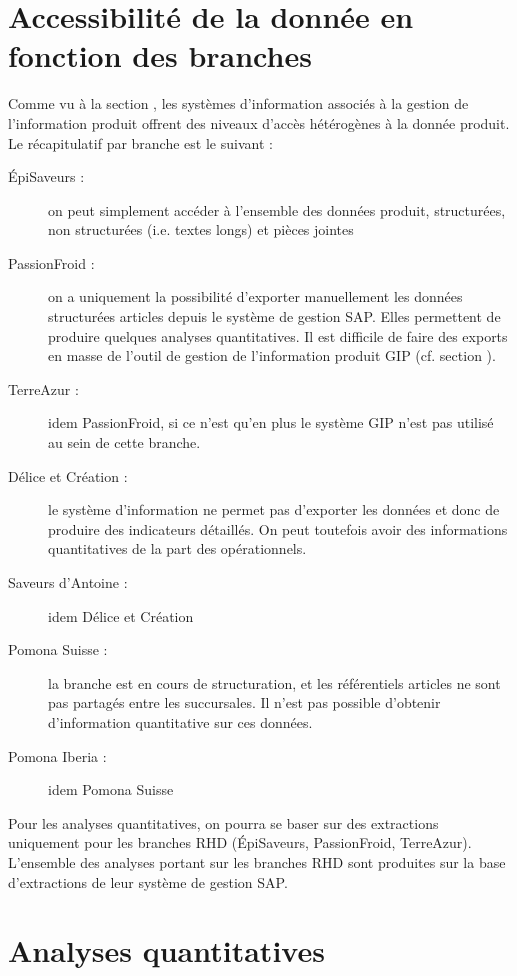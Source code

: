         \section{Accessibilité de la donnée en fonction des branches}

        Comme vu à la section , les systèmes d'information associés à la gestion de l'information produit offrent des niveaux d'accès hétérogènes à la donnée produit.
        Le récapitulatif par branche est le suivant : 
        \begin{description}
            \item[\'{E}piSaveurs :] on peut simplement accéder à l'ensemble des données produit, structurées, non structurées (i.e. textes longs) et pièces jointes
            \item[PassionFroid :] on a uniquement la possibilité d'exporter manuellement les données structurées articles depuis le système de gestion SAP.
            Elles permettent de produire quelques analyses quantitatives.
            Il est difficile de faire des exports en masse de l'outil de gestion de l'information produit GIP (cf. section ).
            \item[TerreAzur :] idem PassionFroid, si ce n'est qu'en plus le système GIP n'est pas utilisé au sein de cette branche.
            \item[Délice et Création :] le système d'information ne permet pas d'exporter les données et donc de produire des indicateurs détaillés. On peut toutefois avoir des informations quantitatives de la part des opérationnels.
            \item[Saveurs d'Antoine :] idem Délice et Création
            \item[Pomona Suisse :] la branche est en cours de structuration, et les référentiels articles ne sont pas partagés entre les succursales. Il n'est pas possible d'obtenir d'information quantitative sur ces données.
            \item[Pomona Iberia :] idem Pomona Suisse
        \end{description}

        Pour les analyses quantitatives, on pourra se baser sur des extractions uniquement pour les branches RHD (\'{E}piSaveurs, PassionFroid, TerreAzur).
        L'ensemble des analyses portant sur les branches RHD sont produites sur la base d'extractions de leur système de gestion SAP.

        \section{Analyses quantitatives}

